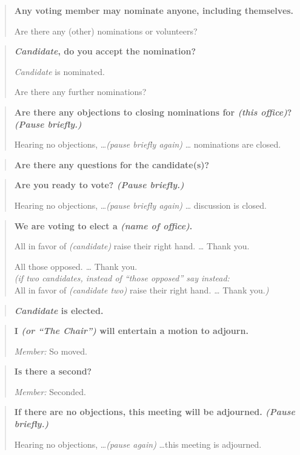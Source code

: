 \documentclass{article}
\newenvironment{chairsays}
               {\parskip 0pt \par %
                \begin{quote}
                 \parskip 0pt \bf}
               {\end{quote}}
\begin{document}
\begin{chairsays}
Any voting member may nominate anyone, including themselves.

Are there any (other) nominations or volunteers?
\end{chairsays}

\begin{chairsays}
{\em Candidate\/}, do you accept the nomination?

{\em Candidate\/} is nominated.

Are there any further nominations?
\end{chairsays}


\begin{chairsays}
Are there any objections to closing nominations for {\em (this office)\/}?
{\em (Pause briefly.)}

Hearing no objections, \ldots {\em (pause briefly again)\/} \ldots
nominations are closed.
\end{chairsays}

\begin{chairsays}
Are there any questions for the candidate(s)?
\end{chairsays}

\begin{chairsays}
Are you ready to vote?
{\em (Pause briefly.)}

Hearing no objections, \ldots {\em (pause briefly again)} \ldots
discussion is closed.
\end{chairsays}

\begin{chairsays}
We are voting to elect a {\em (name of office)}.

All in favor of {\em (candidate)\/} raise their right hand.
{\em \ldots}
Thank you.

All those opposed.
{\em \ldots}
Thank you.
\\
{\it (if two candidates, instead of ``those opposed'' say instead:} \\
All in favor of {\em (candidate two)\/} raise their right hand.
{\em \ldots}
Thank you.{\it )}

\end{chairsays}

\begin{chairsays}
{\em Candidate\/} is elected.
\end{chairsays}

\begin{chairsays}
I \emph{(or \emph{``The Chair''})} will entertain a motion to adjourn.

{\em Member:\/} So moved.
\end{chairsays}

\begin{chairsays}
Is there a second?

{\em Member:\/} Seconded.
\end{chairsays}

\begin{chairsays}
If there are no objections, this meeting will be adjourned.
{\em (Pause briefly.)}

Hearing no objections, \ldots {\em (pause again)} \ldots this meeting
is adjourned.
\end{chairsays}
\end{document}
